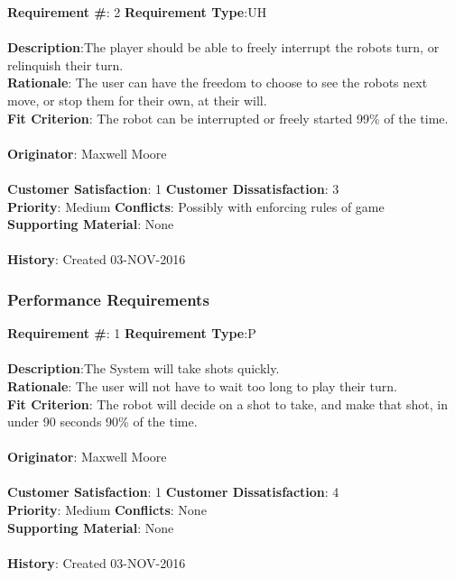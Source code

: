 \documentclass[titlepage]{article}
\begin{document}
\begin{framed}
	\noindent\textbf{Requirement \#}: 2 \hfill \textbf{Requirement Type}:UH \hfill\\\\
	\noindent\textbf{Description}:The player should be able to freely interrupt the robots turn, or relinquish their turn.\\
	\textbf{Rationale}: The user can have the freedom to choose to see the robots next move, or stop them for their own, at their will.\\
	\textbf{Fit Criterion}: The robot can be interrupted or freely started 99\% of the time.\\\\
	\textbf{Originator}: Maxwell Moore\\\\
	\noindent\textbf{Customer Satisfaction}: 1 \hfill 	\textbf{Customer Dissatisfaction}: 3 \hfill\\
	\textbf{Priority}: Medium \hfill \textbf{Conflicts}: Possibly with enforcing rules of game \hfill\\
	\textbf{Supporting Material}: None\\\\
	\noindent\textbf{History}: Created 03-NOV-2016
\end{framed}

\subsubsection{Performance Requirements}
\begin{framed}
	\noindent\textbf{Requirement \#}: 1 \hfill \textbf{Requirement Type}:P\hfill\\\\
	\noindent\textbf{Description}:The System will take shots quickly.\\
	\textbf{Rationale}: The user will not have to wait too long to play their turn.\\
	\textbf{Fit Criterion}: The robot will decide on a shot to take, and make that shot, in under 90 seconds 90\% of the time.\\\\
	\textbf{Originator}: Maxwell Moore\\\\
	\noindent\textbf{Customer Satisfaction}: 1 \hfill 	\textbf{Customer Dissatisfaction}: 4 \hfill\\
	\textbf{Priority}: Medium \hfill \textbf{Conflicts}: None \hfill\\
	\textbf{Supporting Material}: None\\\\
	\noindent\textbf{History}: Created 03-NOV-2016
\end{framed}
\end{document}
